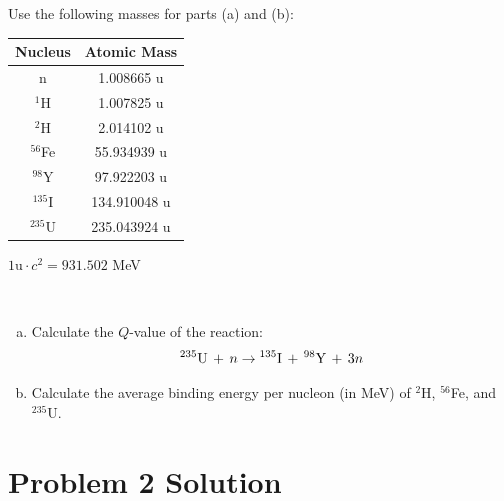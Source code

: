 \documentclass{report}
\begin{document}
Use the following masses for parts (a) and (b):

\begin{table}[htbp]
	\centering
	\begin{tabular}{|c|c|}
			\hline
			Nucleus		&	Atomic Mass \\
			\hline
			n 			&	 1.008665 u \\
			$^{1}$H		& 	 1.007825 u \\
			$^{2}$H 	&	 2.014102 u \\
			$^{56}$Fe	&   55.934939 u \\
			$^{98}$Y 	&   97.922203 u \\
			$^{135}$I	&  134.910048 u \\
			$^{235}$U	&  235.043924 u \\
			\hline
	\end{tabular}
	\label{tab:design-specs}
\end{table}
\begin{center}$1\text{u} \cdot c^{2} = 931.502$ MeV\end{center}
\-\\
\begin{enumerate}[a)]
\item Calculate the $Q$-value of the reaction:
$$ ^{235}\text{U}\, + \,n \-\rightarrow\- ^{135}\text{I}\, + \,^{98}\text{Y}\, + \,3n $$
\item Calculate the average binding energy per nucleon (in MeV) of $^{2}$H, $^{56}$Fe, and $^{235}$U.
\end{enumerate}



\section*{Problem 2 Solution}
\end{document}
